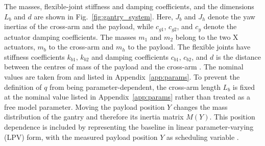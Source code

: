 The masses, flexible-joint stiffness and damping coefficients, and the
dimensions $L_b$ and $d$ are shown in Fig.~\ref{fig:gantry_system}. Here, $J_b$ and $J_h$
denote the yaw inertias of the cross-arm and the payload, while $c_{g1}$, $c_{g2}$, and $c_y$ denote the actuator
damping coefficients.
The masses $m_1$ and $m_2$ belong to the two X actuators,
$m_b$ to the cross-arm and $m_h$ to the payload.
The flexible joints have stiffness coefficients $k_{b1}$, $k_{b2}$ and damping
coefficients $c_{b1}$, $c_{b2}$, and $d$ is the distance between the centres
of mass of the payload and the cross-arm \cite{garcia2013model}.
The nominal values are taken from
\cite[Table~I]{garcia2013model} and listed in Appendix~\ref{app:params}. 
To prevent the definition of \(q\) from being parameter-dependent,
the cross-arm length \(L_b\) is fixed at the nominal value listed in Appendix~\ref{app:params}
rather than treated as a free model parameter.
Moving the payload position $Y$ changes the mass distribution of the gantry and therefore its inertia matrix $M(Y)$.
This position dependence is included by representing the baseline in linear parameter-varying (LPV) form, with the measured payload position \(Y\) as scheduling variable \cite{toth2010modeling}.

